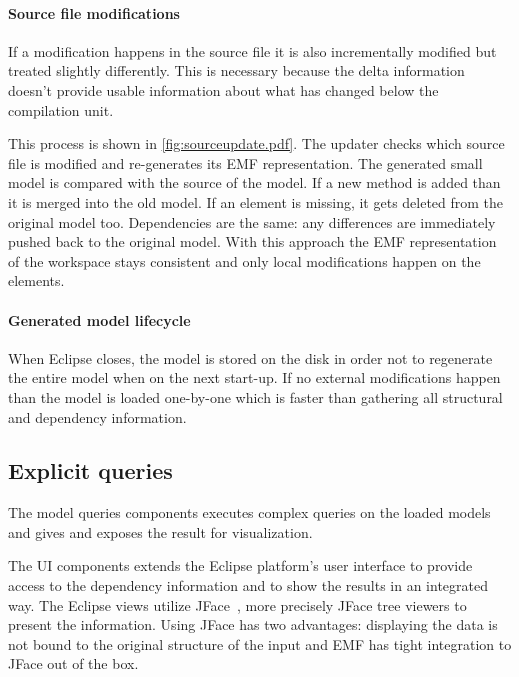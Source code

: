 \paragraph{Source file modifications}
If a modification happens in the source file it is also incrementally modified
but treated slightly differently. This is necessary because the delta
information doesn't provide usable information about what has changed below the
compilation unit.


This process is shown in \autoref{fig:sourceupdate.pdf}. The updater checks
which source file is modified and re-generates its EMF representation. The
generated small model is compared with the source of the model. If a new method
is added than it is merged into the old model. If an element is missing, it gets
deleted from the original model too. Dependencies are the same: any differences
are immediately pushed back to the original model. With this approach the EMF
representation of the workspace stays consistent and only local modifications
happen on the elements.

\paragraph{Generated model lifecycle}
When Eclipse closes, the model is stored on the disk in order not to regenerate
the entire model when on the next start-up. If no external modifications happen
than the model is loaded one-by-one which is faster than gathering all
structural and dependency information.

\subsection{Explicit queries}
\label{sect:elabexplicit}
The model queries components executes complex queries on the loaded models and
gives and exposes the result for  visualization. 

The UI components extends the Eclipse platform's user interface to provide
access to the dependency information and to show the results in an integrated
way. The Eclipse views utilize JFace~\cite{JFace}, more precisely JFace tree
viewers to present the information. Using JFace has two advantages: displaying
the data is not bound to the original structure of the input and EMF has tight
integration to JFace out of the box.


